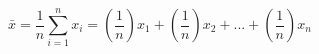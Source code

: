 

\[
\bar{x} = \frac{1} {n} \sum_{i=1}^{n}{x_i} = \left ( \frac{1} {n} \right ) x_1 + \left ( \frac{1} {n} \right ) x_2 + ... + \left ( \frac{1} {n} \right ) x_n
\]


